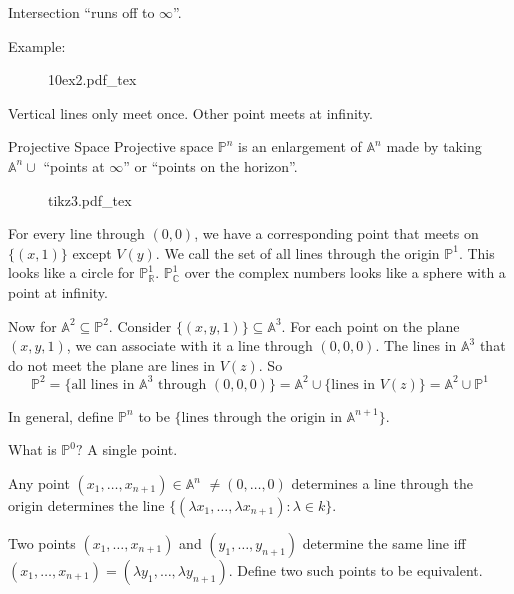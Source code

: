 \documentclass{report}
\begin{document}
Intersection ``runs off to $\infty$''.

Example:
    \begin{figure}
        \centering
        \def\svgwidth{\columnwidth}
        {10ex2.pdf_tex}
    \end{figure}

Vertical lines only meet once. Other point meets at infinity.

\begin{definition}{Projective Space}
    Projective space $\mathbb{P}^{n}$ is an enlargement of $\mathbb{A}^{n}$ made by taking $\mathbb{A}^{n} \cup $ ``points at $\infty$'' or ``points on the horizon''.
\end{definition}

\begin{figure}
    \centering
    \def\svgwidth{\columnwidth}
    {tikz3.pdf_tex}
\end{figure}

For every line through $(0, 0)$, we have a corresponding point that meets on $\{(x, 1)\}$ except $V(y)$. We call the set of all lines through the origin $\mathbb{P}^{1}$. This looks like a circle for $\mathbb{P}_{\mathbb{R}}^{1}$. $\mathbb{P}_{\mathbb{C}}^{1}$ over the complex numbers looks like a sphere with a point at infinity.

Now for $\mathbb{A}^{2} \subseteq \mathbb{P}^{2}$. Consider $\{(x, y, 1)\} \subseteq \mathbb{A}^{3}$. For each point on the plane $(x, y, 1)$, we can associate with it a line through $(0, 0, 0)$. The lines in $\mathbb{A}^{3}$ that do not meet the plane are lines in $V(z)$. So
    \begin{equation*}
        \mathbb{P}^{2} = \{\text{all lines in $\mathbb{A}^{3}$ through $(0, 0, 0)$}\} = \mathbb{A}^{2} \cup \{\text{lines in $V(z)$}\} = \mathbb{A}^{2} \cup \mathbb{P}^{1}
    \end{equation*}

In general, define $\mathbb{P}^{n}$ to be $\{\text{lines through the origin in $\mathbb{A}^{n + 1}$}\}$.

What is $\mathbb{P}^{0}?$ A single point.

Any point $(x_{1}, \ldots, x_{n + 1}) \in \mathbb{A}^{n}$ $\neq (0, \ldots, 0)$ determines a line through the origin determines the line $\{(\lambda x_{1}, \ldots, \lambda x_{n + 1}): \lambda \in k\}$.

Two points $(x_{1}, \ldots, x_{n + 1})$ and $(y_{1}, \ldots, y_{n + 1})$ determine the same line iff $(x_{1}, \ldots, x_{n + 1}) = (\lambda y_{1}, \ldots, \lambda y_{n + 1})$. Define two such points to be equivalent.
\end{document}
